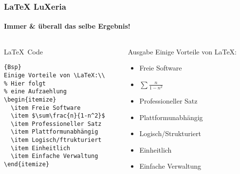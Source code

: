 \begin{frame}[fragile]
    \frametitle{\LaTeX \hfill{} \footnotesize{LuXeria}}
    \framesubtitle{Immer \& überall das selbe Ergebnis!}
    \begin{columns}
        \begin{column}{5cm}
            \begin{block}{\LaTeX~Code}
                
\begin{lstlisting}{Bsp}
Einige Vorteile von \LaTeX:\\
% Hier folgt 
% eine Aufzaehlung
\begin{itemize}
  \item Freie Software
  \item $\sum\frac{n}{1-n^2}$
  \item Professioneller Satz
  \item Plattformunabhängig
  \item Logisch/ftrukturiert
  \item Einheitlich
  \item Einfache Verwaltung
\end{itemize}
\end{lstlisting}
                
            \end{block}
        \end{column}
        \begin{column}{5cm}
            \begin{block}{Ausgabe}
                Einige Vorteile von \LaTeX:\\
                \begin{itemize}
                    \item Freie Software
                    \item $\sum\frac{n}{1-n^2}$
                    \item Professioneller Satz
                    \item Plattformunabhängig
                    \item Logisch/Strukturiert
                    \item Einheitlich
                    \item Einfache Verwaltung
                \end{itemize}
            \end{block}
        \end{column}
    \end{columns}
\end{frame}

